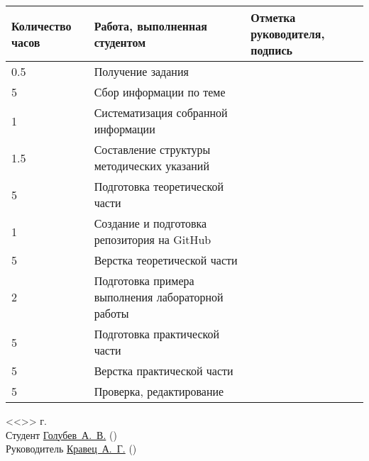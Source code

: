 \documentclass[a4paper, 14pt]{extreport}
\begin{document}
    \begin{table}[h!]
        \centering
        \begin{tabular}{|m{}|m{}|m{}|}
            \hline
            Количество часов & Работа, выполненная студентом & Отметка
            руководителя, подпись \\ \hline
            0.5 & Получение задания & \\ \hline
            5 & Сбор информации по теме & \\ \hline
            1 & Систематизация собранной информации & \\ \hline
            1.5 & Составление структуры методических указаний & \\ \hline
            5 & Подготовка теоретической части & \\ \hline
            1 & Создание и подготовка репозитория на GitHub & \\ \hline
            5 & Верстка теоретической части & \\ \hline
            2 & Подготовка примера выполнения лабораторной работы & \\ \hline
            5 & Подготовка практической части & \\ \hline
            5 & Верстка практической части & \\ \hline
            5 & Проверка, редактирование & \\ \hline
        \end{tabular}
    \end{table}
    \pagestyle{empty}
    \vspace{\fill}
    \noindent<<\underline{\hspace{1cm}}>> \underline{\hspace{5cm}} \the\year г.\\
    Студент \hspace{1cm} \underline{Голубев~А.~В.\hspace{3.2cm}} \hspace{2cm} (\underline{\hspace{5cm}})\\
    Руководитель \underline{Кравец~А.~Г.\hspace{3.45cm}} \hspace{2cm} (\underline{\hspace{5cm}})\\
\end{document}
